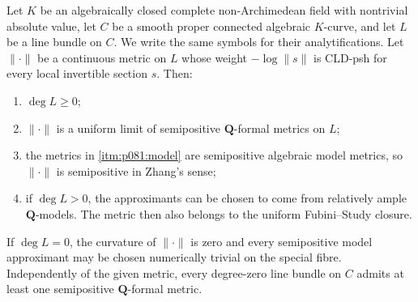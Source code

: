 
\begin{theorem}
\label{thm:p081-curve-local-global}
Let \(K\) be an algebraically closed complete non-Archimedean field with
nontrivial absolute value, let \(C\) be a smooth proper connected
algebraic \(K\)-curve, and let \(L\) be a line bundle on \(C\). We write
the same symbols for their analytifications. Let
\(\lVert\cdot\rVert\) be a continuous metric on \(L\) whose weight
\(-\log\lVert s\rVert\) is CLD-psh for every local invertible section \(s\).
Then:
\begin{enumerate}
\item \(\deg L\geq 0\);
\item\label{itm:p081:model}
      \(\lVert\cdot\rVert\) is a uniform limit of semipositive
      \(\mathbf Q\)-formal metrics on \(L\);
\item the metrics in \cref{itm:p081:model} are semipositive algebraic
      model metrics,
      so \(\lVert\cdot\rVert\) is semipositive in Zhang's sense;
\item if \(\deg L>0\), the approximants
      can be chosen to come from relatively ample \(\mathbf Q\)-models.
      The metric then also belongs to the uniform Fubini--Study closure.
\end{enumerate}
If \(\deg L=0\), the curvature of \(\lVert\cdot\rVert\) is zero and every
semipositive model approximant may be chosen numerically trivial on the
special fibre. Independently of the given metric, every degree-zero line
bundle on \(C\) admits at least one semipositive \(\mathbf Q\)-formal
metric.
\end{theorem}
